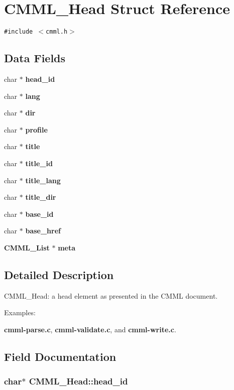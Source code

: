 \section{CMML\_\-Head Struct Reference}
\label{structCMML__Head}
{\tt \#include $<$cmml.h$>$}

\subsection*{Data Fields}
\begin{CompactItemize}
\item 
char $\ast$ {\bf head\_\-id}
\item 
char $\ast$ {\bf lang}
\item 
char $\ast$ {\bf dir}
\item 
char $\ast$ {\bf profile}
\item 
char $\ast$ {\bf title}
\item 
char $\ast$ {\bf title\_\-id}
\item 
char $\ast$ {\bf title\_\-lang}
\item 
char $\ast$ {\bf title\_\-dir}
\item 
char $\ast$ {\bf base\_\-id}
\item 
char $\ast$ {\bf base\_\-href}
\item 
{\bf CMML\_\-List} $\ast$ {\bf meta}
\end{CompactItemize}


\subsection{Detailed Description}
CMML\_\-Head: a head element as presented in the CMML document. \begin{Desc}
\item[Examples: ]\par


{\bf cmml-parse.c}, {\bf cmml-validate.c}, and {\bf cmml-write.c}.\end{Desc}




\subsection{Field Documentation}
\subsubsection{\setlength{\rightskip}{0pt plus 5cm}char$\ast$ {\bf CMML\_\-Head::head\_\-id}}\label{structCMML__Head_o0}


